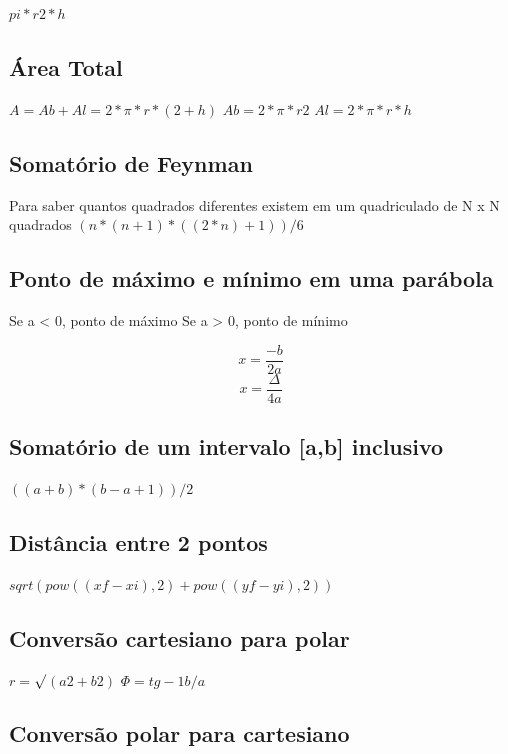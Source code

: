 \documentclass[a4paper,12pt]{article}
\begin{document}
\(pi * r2 * h\)

\subsection{Área Total}

\(A = Ab + Al = 2*\pi*r*(2+h)\) \newline
\(Ab = 2*\pi*r2\) \newline
\(Al = 2*\pi*r*h\)

\subsection{Somatório de Feynman}
Para saber quantos quadrados diferentes existem em um quadriculado de N x N quadrados \newline
\((n*(n+1)*((2*n)+1))/6\)

\subsection{Ponto de máximo e mínimo em uma parábola}
Se a < 0, ponto de máximo\newline
Se a > 0, ponto de mínimo

\begin{equation}
    x = \frac{-b}{2a}
\end{equation}
\begin{equation}
    x = \frac{\Delta}{4a}
\end{equation}

\subsection{Somatório de um intervalo [a,b] inclusivo}

\(((a + b) * (b - a + 1)) / 2\)

\subsection{Distância entre 2 pontos}

\(sqrt(pow((xf-xi),2) + pow((yf-yi),2))\)

\subsection{Conversão cartesiano para polar}

\( r = \)$\surd$\((a 2 + b2)\)\newline
\(\Phi = tg-1 b/a\)

\subsection{Conversão polar para cartesiano}
\end{document}
